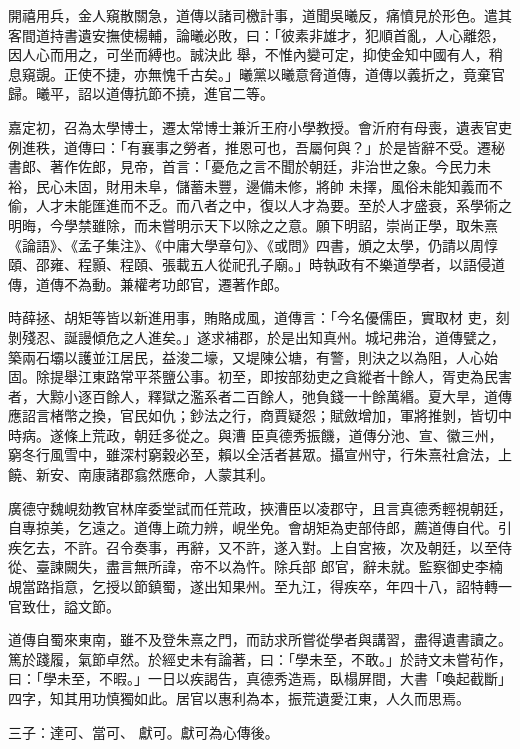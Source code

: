 \begin{pinyinscope}
 開禧用兵，金人窺散關急，道傳以諸司檄計事，道聞吳曦反，痛憤見於形色。遣其客間道持書遺安撫使楊輔，論曦必敗，曰：「彼素非雄才，犯順首亂，人心離怨，因人心而用之，可坐而縛也。誠決此
 舉，不惟內變可定，抑使金知中國有人，稍息窺覬。正使不捷，亦無愧千古矣。」曦黨以曦意脅道傳，道傳以義折之，竟棄官歸。曦平，詔以道傳抗節不撓，進官二等。



 嘉定初，召為太學博士，遷太常博士兼沂王府小學教授。會沂府有母喪，遺表官吏例進秩，道傳曰：「有襄事之勞者，推恩可也，吾屬何與？」於是皆辭不受。遷秘書郎、著作佐郎，見帝，首言：「憂危之言不聞於朝廷，非治世之象。今民力未裕，民心未固，財用未阜，儲蓄未豐，邊備未修，將帥
 未擇，風俗未能知義而不偷，人才未能匯進而不乏。而八者之中，復以人才為要。至於人才盛衰，系學術之明晦，今學禁雖除，而未嘗明示天下以除之之意。願下明詔，崇尚正學，取朱熹《論語》、《孟子集注》、《中庸大學章句》、《或問》四書，頒之太學，仍請以周惇頤、邵雍、程顥、程頤、張載五人從祀孔子廟。」時執政有不樂道學者，以語侵道傳，道傳不為動。兼權考功郎官，遷著作郎。



 時薛拯、胡矩等皆以新進用事，賄賂成風，道傳言：「今名優儒臣，實取材
 吏，刻剝殘忍、誕謾傾危之人進矣。」遂求補郡，於是出知真州。城圮弗治，道傳甓之，築兩石壩以護並江居民，益浚二壕，又堤陳公塘，有警，則決之以為阻，人心始固。除提舉江東路常平茶鹽公事。初至，即按部劾吏之貪縱者十餘人，胥吏為民害者，大黥小逐百餘人，釋獄之濫系者二百餘人，弛負錢一十餘萬緡。夏大旱，道傳應詔言楮幣之換，官民如仇；鈔法之行，商賈疑怨；賦斂增加，軍將推剝，皆切中時病。遂條上荒政，朝廷多從之。與漕
 臣真德秀振饑，道傳分池、宣、徽三州，窮冬行風雪中，雖深村窮穀必至，賴以全活者甚眾。攝宣州守，行朱熹社倉法，上饒、新安、南康諸郡翕然應命，人蒙其利。



 廣德守魏峴劾教官林庠委堂試而任荒政，挾漕臣以凌郡守，且言真德秀輕視朝廷，自專掠美，乞遠之。道傳上疏力辨，峴坐免。會胡矩為吏部侍郎，薦道傳自代。引疾乞去，不許。召令奏事，再辭，又不許，遂入對。上自宮掖，次及朝廷，以至侍從、臺諫闕失，盡言無所諱，帝不以為忤。除兵部
 郎官，辭未就。監察御史李楠覘當路指意，乞授以節鎮蜀，遂出知果州。至九江，得疾卒，年四十八，詔特轉一官致仕，謚文節。



 道傳自蜀來東南，雖不及登朱熹之門，而訪求所嘗從學者與講習，盡得遺書讀之。篤於踐履，氣節卓然。於經史未有論著，曰：「學未至，不敢。」於詩文未嘗茍作，曰：「學未至，不暇。」一日以疾謁告，真德秀造焉，臥榻屏間，大書「喚起截斷」四字，知其用功慎獨如此。居官以惠利為本，振荒遺愛江東，人久而思焉。



 三子：達可、當可、
 獻可。獻可為心傳後。



\end{pinyinscope}